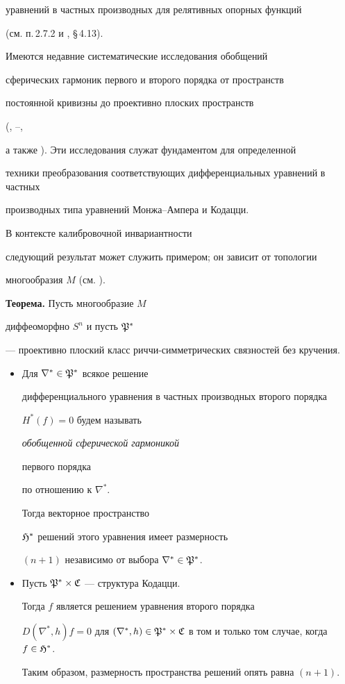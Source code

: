 уравнений в частных производных для релятивных опорных функций

(см. п.\,2.7.2 и \cite{SIM-S-V}, \S\,4.13).

Имеются недавние систематические исследования обобщений

сферических гармоник первого и второго порядка от пространств

постоянной кривизны до проективно плоских пространств

(\cite{G-K-S}, \cite{LED-1}--\cite{LED-S-S-W},


а также \cite{SIM-5}). Эти исследования служат фундаментом для определенной 

техники преобразования соответствующих дифференциальных уравнений в частных

производных типа уравнений Монжа--Ампера и Кодацци.

В контексте калибровочной инвариантности

следующий результат может служить примером; он зависит от топологии

многообразия $M$ (см. \cite {G-K-S}).



{\bf Теорема.} Пусть многообразие $M$

диффеоморфно $S^n$ и пусть $\frak P^*$

--- проективно плоский класс риччи-симметрических связностей без кручения.

\begin{itemize}

\item[(i)] Для $\nabla^* \in \frak P^*$ всякое решение

дифференциального уравнения в частных производных второго порядка

$H^*(f) = 0$ будем называть {\it обобщенной сферической гармоникой

первого порядка} по отношению к $\nabla^*$.

Тогда векторное пространство

$\frak {H}^*$ решений этого уравнения имеет размерность

$(n+1)$ независимо от выбора $\nabla^* \in \frak P^*$.

\item[(ii)] Пусть $\frak P^* \times \frak C$ --- структура Кодацци.

Тогда $f$ является решением уравнения второго порядка

$D(\nabla^*,h)f = 0$ для $(\nabla^*,h) \in \frak P^* \times

\frak C$ в том и только том случае, когда $f \in \frak H^*$.

Таким образом, размерность пространства решений опять равна $(n+1)$.

\end{itemize}






